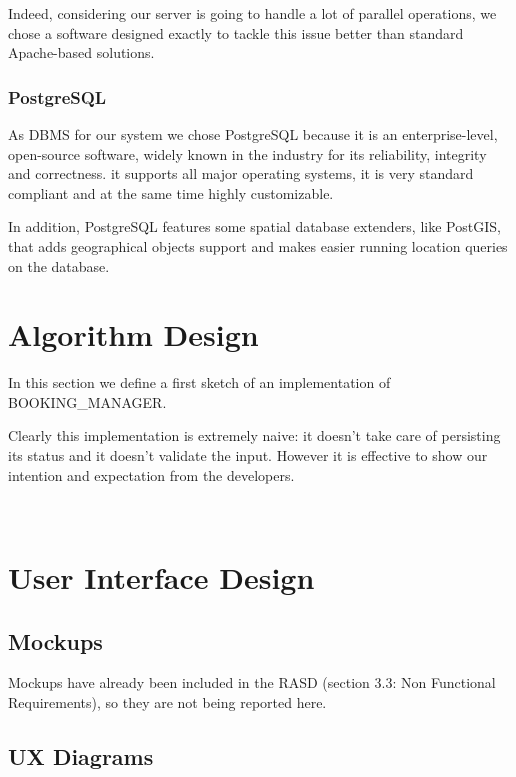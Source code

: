 \documentclass[11pt]{article} %
\begin{document}
Indeed, considering our server is going to handle a lot of parallel operations, we chose a software designed exactly to tackle this issue better than standard Apache-based solutions.

\subsubsection{PostgreSQL}

As DBMS for our system we chose PostgreSQL because it is an enterprise-level, open-source software, widely known in the industry for its reliability, integrity and correctness. it supports all major operating systems, it is very standard compliant and at the same time highly customizable.

In addition, PostgreSQL features some spatial database extenders, like PostGIS, that adds geographical objects support and makes easier running location queries on the database.





\newpage
\section{Algorithm Design}

In this section we define a first sketch of an implementation of BOOKING\_MANAGER. 

Clearly this implementation is extremely naive: it doesn't take care of persisting its status and it doesn't validate the input. However it is effective to show our intention and expectation from the developers.

\hfil\\



\newpage
\section{User Interface Design}

\subsection{Mockups}
Mockups have already been included in the RASD (section 3.3: Non Functional Requirements), so they are not being reported here.

\subsection{UX Diagrams}
\end{document}
